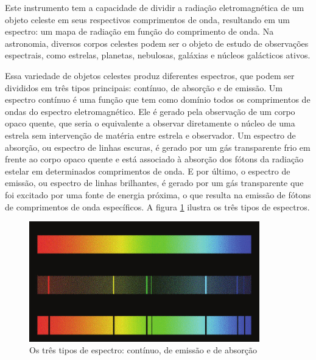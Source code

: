 Este instrumento tem a capacidade de dividir a radiação eletromagnética de um objeto celeste em seus respectivos comprimentos de onda, resultando em um espectro: um mapa de radiação em função do comprimento de onda. Na astronomia, diversos corpos celestes podem ser o objeto de estudo de observações espectrais, como estrelas, planetas, nebulosas, galáxias e núcleos galácticos ativos.  


Essa variedade de objetos celestes produz diferentes espectros, que podem ser divididos em três tipos principais: contínuo, de absorção e de emissão. Um espectro contínuo é uma função que tem como domínio todos os comprimentos de ondas do espectro eletromagnético.
Ele é gerado pela observação de um corpo opaco quente, que seria o equivalente a observar diretamente o núcleo de uma estrela sem intervenção de matéria entre estrela e observador. Um espectro de absorção, ou espectro de linhas escuras, é gerado por um gás transparente frio em frente ao corpo opaco quente e está associado à absorção dos fótons da radiação estelar em determinados comprimentos de onda. E por último, o espectro de emissão, ou espectro de linhas brilhantes, é gerado por um gás transparente que foi excitado por uma fonte de energia próxima, o que resulta na emissão de fótons de comprimentos de onda específicos. A figura \ref{fig:spectrum-types} ilustra os três tipos de espectros. 

\begin{figure}[htb]
\centering
\includegraphics[width=10cm]{figuras/Continuous-spectrum-and-two-types-of-line-spectra.png}
\caption{Os três tipos de espectro: contínuo, de emissão e de absorção \citep{mcgrawhill}}
\label{fig:spectrum-types}
\end{figure}

